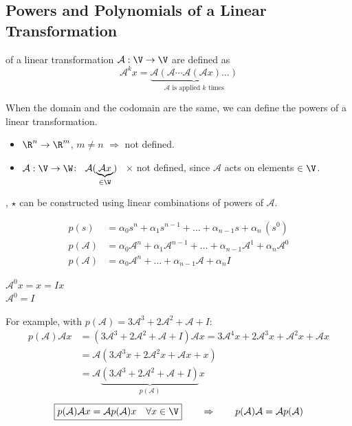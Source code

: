\subsection{Powers and Polynomials of a Linear Transformation}\label{ss:powers}
\begin{definition}
 of a linear transformation $\mathcal{A}:\V\to\V$ are defined as
\[
\mathcal{A}^k x=\underbrace{\mathcal{A}(\mathcal{A}\cdots\mathcal{A}(\mathcal{A}x)\dots)}_{\mathcal{A}\text{ is applied }k\text{ times}}
\]
\end{definition}
When the domain and the codomain are the same, we can define the powers of a linear transformation.
\begin{itemize}[nosep,leftmargin=1.5em]
\item $\R^n\to\R^m$, $m\neq n$ $\Rightarrow$ not defined.
\item $\mathcal{A}:\V\to\W$: \ $\mathcal{A}(\underbrace{\mathcal{A}x}_{\in\W})$ \ $\times$ not defined, since $\mathcal{A}$ acts on elements $\in\V$.
\end{itemize}

\sep
$\star$  can be constructed using linear combinations of powers of $\mathcal{A}$.
\begin{center}
\begin{minipage}{0.66\textwidth}
\begin{align*}
p(s)&=\alpha_0s^n+\alpha_1s^{n-1}+\dots+\alpha_{n-1}s+\alpha_n\,(s^0)\\
p(\mathcal{A})&=\alpha_0\mathcal{A}^n+\alpha_1\mathcal{A}^{n-1}+\dots+\alpha_{n-1}\mathcal{A}^1+\alpha_n\mathcal{A}^0\\
p(\mathcal{A})&=\alpha_0\mathcal{A}^n+\dots+\alpha_{n-1}\mathcal{A}+\alpha_nI
\end{align*}
\end{minipage}\hfill
\begin{minipage}{0.28\textwidth}
\begin{keybox}
\centering
$\mathcal{A}^0x=x=Ix$\\
$\mathcal{A}^0=I$
\end{keybox}
\end{minipage}
\end{center}
For example, with $p(\mathcal{A})=3\mathcal{A}^3+2\mathcal{A}^2+\mathcal{A}+I$:
\begin{align*}
p(\mathcal{A})\mathcal{A}x&=(3\mathcal{A}^3+2\mathcal{A}^2+\mathcal{A}+I)\mathcal{A}x=3\mathcal{A}^4x+2\mathcal{A}^3x+\mathcal{A}^2x+\mathcal{A}x\\
&=\mathcal{A}(3\mathcal{A}^3x+2\mathcal{A}^2x+\mathcal{A}x+x)\\
&=\mathcal{A}\underbrace{(3\mathcal{A}^3+2\mathcal{A}^2+\mathcal{A}+I)}_{p(\mathcal{A})}x
\end{align*}
\[
\boxed{p(\mathcal{A})\mathcal{A}x=\mathcal{A}p(\mathcal{A})x\quad\forall x\in\V}
\qquad\Rightarrow\qquad
p(\mathcal{A})\mathcal{A}=\mathcal{A}p(\mathcal{A})
\]

